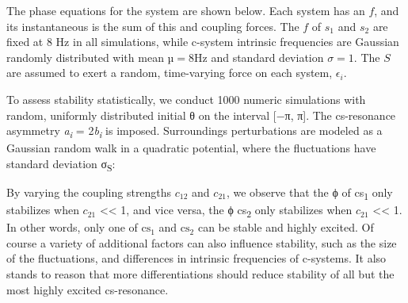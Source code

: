 

  The phase equations for the system are shown below. Each system has an  $f$, and its instantaneous  is the sum of this  and coupling forces. The $f$ of $s_1$ and $s_2$ are fixed at 8 Hz in all simulations, while c-system intrinsic frequencies are Gaussian randomly distributed with mean $µ = 8 \text{Hz}$ and standard deviation $σ = 1$. The  $S$ are assumed to exert a random, time-varying force on each system,  ${\epsilon} _{i}$. 


  To assess stability statistically, we conduct 1000 numeric simulations with random, uniformly distributed initial θ on the interval [−π, π]. The cs-resonance asymmetry \textit{a\textsubscript{i}} = 2\textit{b\textsubscript{i}} is imposed. Surroundings perturbations are modeled as a Gaussian random walk in a quadratic potential, where the fluctuations have standard deviation σ\textsubscript{S}:

 

  By varying the coupling strengths $c_{12}$ and $c_{21}$,  we observe that the ϕ of cs\textsubscript{1} only stabilizes when $c_{21}$ << 1, and vice versa, the ϕ  cs\textsubscript{2} only stabilizes when $c_{21}$ << 1. In other words, only one of $\text{cs}_{1}$ and $\text{cs}_{2}$ can be stable and highly excited. Of course a variety of additional factors can also influence stability, such as the size of the  fluctuations, and differences in intrinsic frequencies of c-systems. It also stands to reason that more differentiations should reduce stability of all but the most highly excited cs-resonance.

